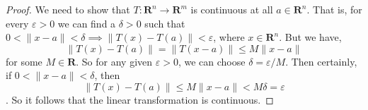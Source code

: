 \begin{questions}

\begin{solution}
\begin{proof}
    We need to show that $T:\mathbf{R}^n\to\mathbf{R}^m$ is continuous at all $a\in \mathbf{R}^n$. That is, for every $\varepsilon>0$ we can find a $\delta>0$ such that $0<\|x-a\|<\delta\implies\|T(x)-T(a)\|<\varepsilon$, where $x\in \mathbf{R}^n$. But we have,
    $$\|T(x)-T(a)\| = \|T(x-a)\|\le M\|x-a\|$$
    for some $M\in\mathbf{R}$. So for any given $\varepsilon>0$, we can choose $\delta=\varepsilon/M$. Then certainly, if $0<\|x-a\|<\delta$, then
    $$\|T(x)-T(a)\|\le M\|x-a\|< M\delta=\varepsilon$$.
    So it follows that the linear transformation is continuous.
\end{proof}
\end{solution}

\end{questions}